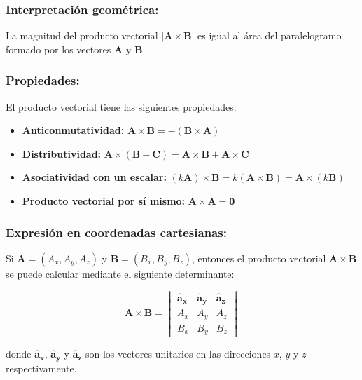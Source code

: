 \documentclass{book}
\begin{document}
\subsubsection{Interpretación geométrica:} La magnitud del producto vectorial $|\mathbf{A} \times \mathbf{B}|$ es igual al área del paralelogramo formado por los vectores $\mathbf{A}$ y $\mathbf{B}$.


\subsubsection{Propiedades:} 

El producto vectorial tiene las siguientes propiedades:

\begin{itemize}
\item[\textbullet] \textbf{Anticonmutatividad:} $\mathbf{A} \times \mathbf{B} = - (\mathbf{B} \times \mathbf{A})$
 \item[\textbullet] \textbf{Distributividad:} $\mathbf{A} \times (\mathbf{B} + \mathbf{C}) = \mathbf{A} \times \mathbf{B} + \mathbf{A} \times \mathbf{C}$
 \item[\textbullet] \textbf{Asociatividad con un escalar:} $(k \mathbf{A}) \times \mathbf{B} = k (\mathbf{A} \times \mathbf{B}) = \mathbf{A} \times (k \mathbf{B})$
 \item[\textbullet] \textbf{Producto vectorial por sí mismo:} $\mathbf{A} \times \mathbf{A} = \mathbf{0}$
\end{itemize}

\subsubsection{Expresión en coordenadas cartesianas:} 

Si $\mathbf{A} = (A_x, A_y, A_z)$ y $\mathbf{B} = (B_x, B_y, B_z)$, entonces el producto vectorial $\mathbf{A} \times \mathbf{B}$ se puede calcular mediante el siguiente determinante:

\begin{equation}
\mathbf{A} \times \mathbf{B} =
\begin{vmatrix}
\mathbf{\hat{a}_x} & \mathbf{\hat{a}_y} & \mathbf{\hat{a}_z} \\
A_x & A_y & A_z \\
B_x & B_y & B_z
\end{vmatrix}
\label{eq:producto_cruz_cartesiano}
\end{equation}

donde $\mathbf{\hat{a}_x}$, $\mathbf{\hat{a}_y}$ y $\mathbf{\hat{a}_z}$ son los vectores unitarios en las direcciones $x$, $y$ y $z$ respectivamente.
\end{document}
